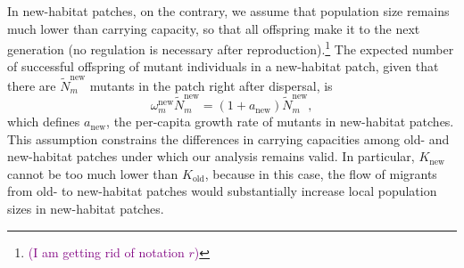 \documentclass[11pt]{article}
\newcommand{\florence}[1]{\textcolor{purple}{(#1)}} %
\begin{document}

In new-habitat patches, on the contrary, we assume that population size remains much lower than carrying capacity, so that all offspring make it to the next generation (no regulation is necessary after reproduction).\footnote{\florence{I am getting rid of notation $r$}} The expected number of successful offspring of mutant individuals in a new-habitat patch, given that there are $\widetilde{N}^{\text{new}}_m$ mutants in the patch right after dispersal, is 
%
\begin{equation}\label{eq:defanew}
\omega_{m}^{\text{new}} \widetilde{N}^{\text{new}}_m = \left(1+a_{\text{new}} \right) \widetilde{N}^{\text{new}}_m,
\end{equation}
which defines $a_{\text{new}}$, the per-capita growth rate of mutants in new-habitat patches. This assumption constrains the differences in carrying capacities among old- and new-habitat patches under which our analysis remains valid. In particular, $K_{\text{new}}$ cannot be too much lower than $K_{\text{old}}$, because in this case, the flow of migrants from old- to new-habitat patches would substantially increase local population sizes in new-habitat patches. 
\end{document}
